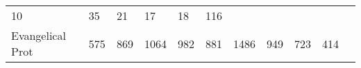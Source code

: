\documentclass[]{article}
\begin{document}
\begin{longtable}[]{@{}lllllllllll@{}}
\begin{minipage}[t]{0.05\columnwidth}
10\strut
\end{minipage} & \begin{minipage}[t]{0.05\columnwidth}\raggedright\strut
35\strut
\end{minipage} & \begin{minipage}[t]{0.06\columnwidth}\raggedright\strut
21\strut
\end{minipage} & \begin{minipage}[t]{0.06\columnwidth}\raggedright\strut
17\strut
\end{minipage} & \begin{minipage}[t]{0.04\columnwidth}\raggedright\strut
18\strut
\end{minipage} & \begin{minipage}[t]{0.11\columnwidth}\raggedright\strut
116\strut
\end{minipage}\tabularnewline
\begin{minipage}[t]{0.14\columnwidth}\raggedright\strut
Evangelical Prot\strut
\end{minipage} & \begin{minipage}[t]{0.04\columnwidth}\raggedright\strut
575\strut
\end{minipage} & \begin{minipage}[t]{0.05\columnwidth}\raggedright\strut
869\strut
\end{minipage} & \begin{minipage}[t]{0.05\columnwidth}\raggedright\strut
1064\strut
\end{minipage} & \begin{minipage}[t]{0.05\columnwidth}\raggedright\strut
982\strut
\end{minipage} & \begin{minipage}[t]{0.05\columnwidth}\raggedright\strut
881\strut
\end{minipage} & \begin{minipage}[t]{0.05\columnwidth}\raggedright\strut
1486\strut
\end{minipage} & \begin{minipage}[t]{0.06\columnwidth}\raggedright\strut
949\strut
\end{minipage} & \begin{minipage}[t]{0.06\columnwidth}\raggedright\strut
723\strut
\end{minipage} & \begin{minipage}[t]{0.04\columnwidth}\raggedright\strut
414\strut
\end{minipage} & \begin{minipage}[t]{0.11\columnwidth}\raggedright\strut

\end{minipage}
\end{longtable}
\end{document}
